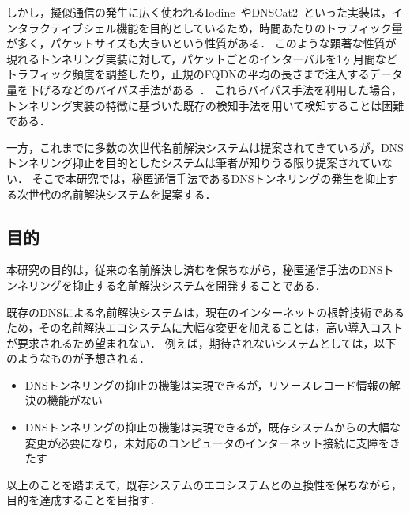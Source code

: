 しかし，擬似通信の発生に広く使われるIodine~\cite{iodine}やDNSCat2~\cite{dnscat2}といった実装は，インタラクティブシェル機能を目的としているため，時間あたりのトラフィック量が多く，パケットサイズも大きいという性質がある．
このような顕著な性質が現れるトンネリング実装に対して，パケットごとのインターバルを1ヶ月間などトラフィック頻度を調整したり，正規のFQDNの平均の長さまで注入するデータ量を下げるなどのバイパス手法がある~\cite{asaf}．
これらバイパス手法を利用した場合，トンネリング実装の特徴に基づいた既存の検知手法を用いて検知することは困難である．

一方，これまでに多数の次世代名前解決システムは提案されてきているが，DNSトンネリング抑止を目的としたシステムは筆者が知りうる限り提案されていない．
そこで本研究では，秘匿通信手法であるDNSトンネリングの発生を抑止する次世代の名前解決システムを提案する．


\subsection{目的}
本研究の目的は，従来の名前解決し済むを保ちながら，秘匿通信手法のDNSトンネリングを抑止する名前解決システムを開発することである．

既存のDNSによる名前解決システムは，現在のインターネットの根幹技術であるため，その名前解決エコシステムに大幅な変更を加えることは，高い導入コストが要求されるため望まれない．
例えば，期待されないシステムとしては，以下のようなものが予想される．
\begin{itemize}
 \setlength{\itemsep}{-0.5mm}
 \item DNSトンネリングの抑止の機能は実現できるが，リソースレコード情報の解決の機能がない
 \item DNSトンネリングの抑止の機能は実現できるが，既存システムからの大幅な変更が必要になり，未対応のコンピュータのインターネット接続に支障をきたす
\end{itemize}
以上のことを踏まえて，既存システムのエコシステムとの互換性を保ちながら，目的を達成することを目指す．

